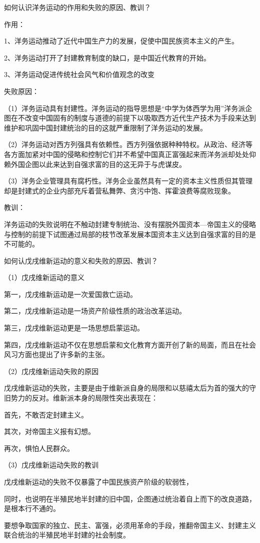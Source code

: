 \documentclass[lang=cn,10pt]{elegantbook}
\begin{document}
	\begin{example}
		如何认识洋务运动的作用和失败的原因、教训？
	\end{example}
	\begin{solution}
		作用：
		
		1、洋务运动推动了近代中国生产力的发展，促使中国民族资本主义的产生。
				
		2、洋务运动打开了封建教育制度的缺口，是中国近代教育的开始。
		
		3、洋务运动促进传统社会风气和价值观念的改变
		
		失败原因：
		
		（1）洋务运动具有封建性。洋务运动的指导思想是“中学为体西学为用”洋务派企图在不改变中国固有的制度与道德的前提下以吸取西方近代生产技术为手段来达到维护和巩固中国封建统治的目的这就严重限制了洋务运动的发展。
		
		（2）洋务运动对西方列强具有依赖性。西方列强依据种种特权。从政治、经济等各方面加紧对中国的侵略和控制它们并不希望中国真正富强起来而洋务派却处处仰赖外国企图以此来达到自强求富的目的这无异于与虎谋皮。
		
		（3）洋务企业管理具有腐朽性。洋务企业虽然具有一定的资本主义性质但其管理却是封建式的企业内部充斥着营私舞弊、贪污中饱、挥霍浪费等腐败现象。
		
		教训：
		
		洋务运动的失败说明在不触动封建专制统治、没有摆脱外国资本—帝国主义的侵略与控制的前提下试图通过局部的枝节改革发展本国资本主义达到自强求富的目的是不可能的。
	\end{solution}
	\begin{example}
		如何认戊戌维新运动的意义和失败的原因、教训？
	\end{example}
	\begin{solution}
		（1）戊戌维新运动的意义
		
		第一，戊戌维新运动是一次爱国救亡运动。
		
		第二，戊戌维新运动是一场资产阶级性质的政治改革运动。
		
		第三，戊戌维新运动更是一场思想启蒙运动。
		
		第四，戊戌维新运动不仅在思想启蒙和文化教育方面开创了新的局面，而且在社会风习方面也提出了许多新的主张。
		
		（2）戊戌维新运动失败的原因
		
		戊戌维新运动的失败，主要是由于维新派自身的局限和以慈禧太后为首的强大的守旧势力的反对。维新派本身的局限性突出表现在：
		
		首先，不敢否定封建主义。
		
		其次，对帝国主义报有幻想。
		
		再次，惧怕人民群众。
		
		（3）戊戌维新运动失败的教训
		
		戊戌维新运动的失败不仅暴露了中国民族资产阶级的软弱性，
		
		同时，也说明在半殖民地半封建的旧中国，企图通过统治着自上而下的改良道路，是根本行不通的。
		
		要想争取国家的独立、民主、富强，必须用革命的手段，推翻帝国主义、封建主义联合统治的半殖民地半封建的社会制度。
	\end{solution}
\end{document}
